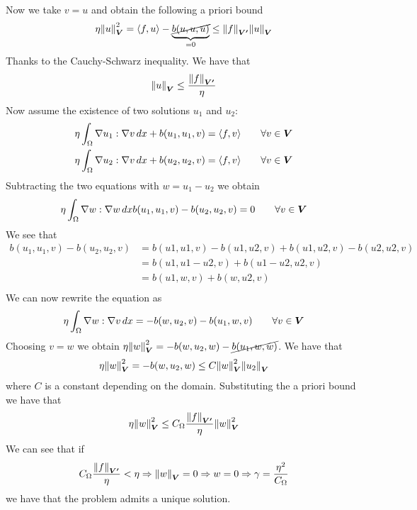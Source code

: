 \begin{enumerate}
\[\begin{split}
        \end{split}
    \]
    Now we take \(v = u\) and obtain the following a priori bound
    \[
        \begin{split}
            \eta \norm{u}_{\bm{V}}^2 = \langle f, u \rangle - \underbrace{\cancel{b(u, u, u)}}_{=0} \leq \norm{f}_{\bm{V'}} \norm{u}_{\bm{V}} 
        \end{split}
    \]
    Thanks to the Cauchy-Schwarz inequality. We have that 
    \[
        \begin{split}
            \norm{u}_{\bm{V}} \leq \frac{\norm{f}_{\bm{V'}}}{\eta}
        \end{split}
    \]
    Now assume the existence of two solutions \(u_1\) and \(u_2\):
    \begin{align*}
        \eta \int_\Omega \nabla u_1 : \nabla v \, dx + b(u_1, u_1, v) &= \langle f, v \rangle \qquad \forall v \in \bm{V} \\
        \eta \int_\Omega \nabla u_2 : \nabla v \, dx + b(u_2, u_2, v) &= \langle f, v \rangle \qquad \forall v \in \bm{V}
    \end{align*}
    Subtracting the two equations with \(w = u_1 - u_2\) we obtain
    \[
        \begin{split}
            \eta \int_\Omega \nabla w : \nabla w \, dx b(u_1, u_1, v) - b(u_2, u_2, v) = 0 \qquad \forall v \in \bm{V}
        \end{split}
    \]
    We see that 
    \begin{align*}
        b(u_1, u_1, v) - b(u_2, u_2, v) &= b(u1, u1, v) - b(u1, u2, v) + b(u1, u2, v) - b(u2, u2, v) \\
        &= b(u1, u1 - u2, v) + b(u1 - u2, u2, v) \\
        &= b(u1, w, v) + b(w, u2, v) \\
    \end{align*}
    We can now rewrite the equation as
    \[
        \begin{split}
            \eta \int_\Omega \nabla w : \nabla v \, dx= -b(w, u_2, v) - b(u_1, w, v) \qquad \forall v \in \bm{V}
        \end{split}
    \]
    Choosing \(v = w\) we obtain \(\eta \norm{w}_{\bm{V}}^2 = -b(w, u_2, w) - \cancel{b(u_1, w, w)}\). We have that
    \[
        \begin{split}
            \eta \norm{w}_{\bm{V}}^2 = -b(w, u_2, w) \leq C \norm{w}_{\bm{V}}^2 \norm{u_2}_{\bm{V}}
        \end{split}
    \]
    where \(C\) is a constant depending on the domain. Substituting the a priori bound we have that
    \[
        \begin{split}
             \eta \norm{w}_{\bm{V}}^2 \leq C_\Omega \frac{\norm{f}_{\bm{V'}}}{\eta} \norm{w}_{\bm{V}}^2
        \end{split}
    \]
    We can see that if
    \[
        \begin{split}
            C_\Omega \frac{\norm{f}_{\bm{V'}}}{\eta} < \eta \Rightarrow \norm{w}_{\bm{V}} = 0 \Rightarrow w = 0 \Rightarrow \gamma = \frac{\eta^2}{C_\Omega} 
        \end{split}
    \]
    we have that the problem admits a unique solution. 



\end{enumerate}
